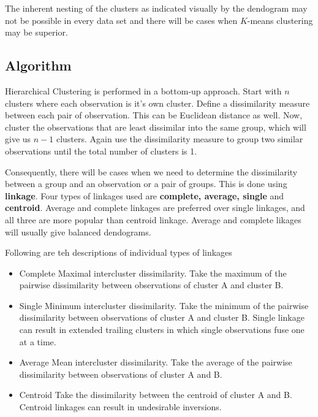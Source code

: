 \documentclass[../statistical_learning_notes.tex]{subfiles}
\begin{document}
    The inherent nesting of the clusters as indicated visually by the dendogram may not be possible in every data set and there will be cases when $K$-means clustering may be superior.


    \subsection{Algorithm}
    Hierarchical Clustering is performed in a bottom-up approach. Start with $n$ clusters where each observation is it's own cluster. Define a dissimilarity measure between each pair of observation. This can be Euclidean distance as well. Now, cluster the observations that are least dissimilar into the same group, which will give us $n-1$ clusters. Again use the dissimilarity measure to group two similar observations until the total number of clusters is 1.\newline

    Consequently, there will be cases when we need to determine the dissimilarity between a group and an observation or a pair of groups. This is done using \textbf{linkage}. Four types of linkages used are \textbf{complete, average, single} and \textbf{centroid}. Average and complete linkages are preferred over single linkages, and all three are more popular than centroid linkage. Average and complete likages will usually give balanced dendograms.\newline

    Following are teh descriptions of individual types of linkages
    \begin{itemize}
         \item Complete\newline
         Maximal intercluster dissimilarity. Take the maximum of the pairwise dissimilarity between observations of cluster A and cluster B.
         \item Single\newline
         Minimum intercluster dissimilarity. Take the minimum of the pairwise dissimilarity between observations of cluster A and cluster B.\newline
         Single linkage can result in extended trailing clusters in which single observations fuse one at a time.
         \item Average\newline
         Mean intercluster dissimilarity. Take the average of the pairwise dissimilarity between observations of cluster A and B.
         \item Centroid\newline
         Take the dissimilarity between the centroid of cluster A and B. Centroid linkages can result in undesirable inversions.
    \end{itemize}
\end{document}
